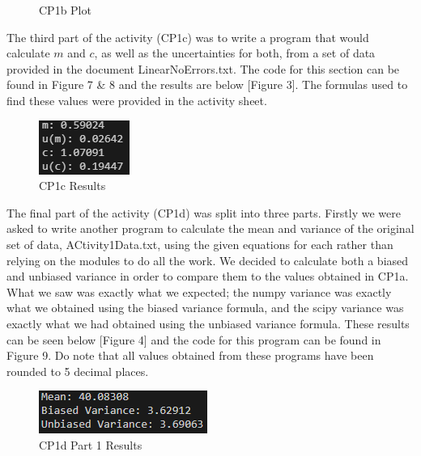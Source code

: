 \documentclass[12pt]{article}
\begin{document}
    \begin{figure}[H]
        \begin{center}
           
           \caption{CP1b Plot}
           \label{Figure 2}
        \end{center}
    \end{figure}
    
    \noindent
    The third part of the activity (CP1c) was to write a program that would calculate $m$ 
    and $c$, as well as the uncertainties for both, from a set of data provided in the 
    document LinearNoErrors.txt. The code for this section can be found in Figure 7 \& 8 
    and the results are below [Figure 3]. The formulas used to find these values were 
    provided in the activity sheet. 
    
    \begin{figure}[H]
        \begin{center}
           \includegraphics[scale=1]{CP1c results.png}
           \caption{CP1c Results}
           \label{Figure 3}
        \end{center}
    \end{figure}

    \newpage
    \noindent
    The final part of the activity (CP1d) was split into three parts. Firstly we were asked to 
    write another program to calculate the mean and variance of the original set of data, 
    ACtivity1Data.txt, using the given equations for each rather than relying on the 
    modules to do all the work. We decided to calculate both a biased and unbiased variance 
    in order to compare them to the values obtained in CP1a. What we saw was exactly what 
    we expected; the numpy variance was exactly what we obtained using the biased variance 
    formula, and the scipy variance was exactly what we had obtained using the unbiased 
    variance formula. These results can be seen below [Figure 4] and the code for this 
    program can be found in Figure 9. Do note that all values obtained from these 
    programs have been rounded to 5 decimal places.

    \begin{figure}[H]
        \begin{center}
           \includegraphics[scale=1]{CP1d part 1 results.png}
           \caption{CP1d Part 1 Results}
           \label{Figure 4}
        \end{center}
    \end{figure}
    
\end{document}

